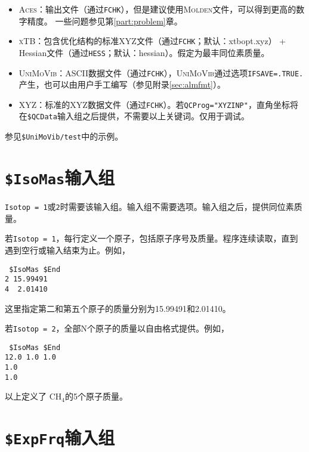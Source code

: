 \documentclass[12pt,a4paper,openany,twoside,cap,UTF8]{ctexbook}
\begin{document}
\begin{itemize}
\item \textsc{Aces}：输出文件（通过\verb|FCHK|），但是建议使用\textsc{Molden}文件，可以得到更高的数字精度。 一些问题参见第\ref{part:problem}章。
\item \textsc{xTB}：包含优化结构的标准XYZ文件（通过\verb|FCHK|；默认：xtbopt.xyz） + Hessian文件（通过\verb|HESS|；默认：hessian）。假定为最丰同位素质量。
\item \textsc{UniMoVib}：ASCII数据文件（通过\verb|FCHK|），\textsc{UniMoVib}通过选项\verb|IFSAVE=.TRUE.|产生，也可以由用户手工编写（参见附录\ref{sec:almfmt}）。
\item XYZ：标准的XYZ数据文件（通过\verb|FCHK|）。若\verb|QCProg="XYZINP"|，直角坐标将在\texttt{\$QCData}输入组之后提供，不需要以上关键词。仅用于调试。
\end{itemize}

参见\verb|$UniMoVib/test|中的示例。

\section{\texttt{\$IsoMas}输入组} \label{sec:inp-isomas}

\verb|Isotop = 1|或\verb|2|时需要该输入组。输入组不需要选项。输入组之后，提供同位素质量。

\bigskip{}\noindent
若\verb|Isotop = 1|，每行定义一个原子，包括原子序号及质量。程序连续读取，直到遇到空行或输入结束为止。例如，
\begin{colorboxed}[oval=false,boxcolor=blue!75!black,bgcolor=blue!5!white]
\ttfamily
\begin{lstlisting}
 $IsoMas $End
2 15.99491
4  2.01410
\end{lstlisting}\end{colorboxed}
这里指定第二和第五个原子的质量分别为15.99491和2.01410。

\bigskip{}\noindent
若\verb|Isotop = 2|，全部N个原子的质量以自由格式提供。例如，\\
\begin{colorboxed}[oval=false,boxcolor=blue!75!black,bgcolor=blue!5!white]
\ttfamily
\begin{lstlisting}
 $IsoMas $End
12.0 1.0 1.0
1.0
1.0
\end{lstlisting}\end{colorboxed}
以上定义了 CH$_4$的5个原子质量。

\section{\texttt{\$ExpFrq}输入组} \label{sec:inp-expfrq}
\end{document}
